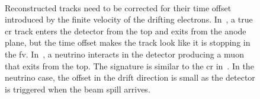 \begin{figure}[]
\centering
{} \quad 
{} \\ 
\caption[Example of Anode Crossing Cosmic Track]{Reconstructed tracks need to be corrected for their time offset introduced by the finite velocity of the drifting electrons. In~\protect{}, a true \acrshort{cr} track enters the detector from the top and exits from the anode plane, but the time offset makes the track look like it is stopping in the \acrshort{fv}. In~\protect{}, a neutrino interacts in the detector producing a muon that exits from the top. The signature is similar to the \acrshort{cr} in~\protect{}. In the neutrino case, the offset in the drift direction is small as the detector is triggered when the beam spill arrives.}
\label{fig:acpt}
\end{figure}



